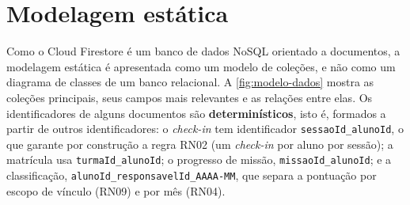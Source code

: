\section{Modelagem estática}
\label{sec:modelagem-estatica}

Como o Cloud Firestore é um banco de dados NoSQL orientado a documentos,
a modelagem estática é apresentada como um modelo de coleções, e não como
um diagrama de classes de um banco relacional. A \autoref{fig:modelo-dados}
mostra as coleções principais, seus campos mais relevantes e as relações
entre elas. Os identificadores de alguns documentos são
\textbf{determinísticos}, isto é, formados a partir de outros
identificadores: o \textit{check-in} tem identificador
\texttt{sessaoId\_alunoId}, o que garante por construção a regra RN02
(um \textit{check-in} por aluno por sessão); a matrícula usa
\texttt{turmaId\_alunoId}; o progresso de missão,
\texttt{missaoId\_alunoId}; e a classificação,
\texttt{alunoId\_responsavelId\_AAAA-MM}, que separa a pontuação por escopo
de vínculo (RN09) e por mês (RN04).


